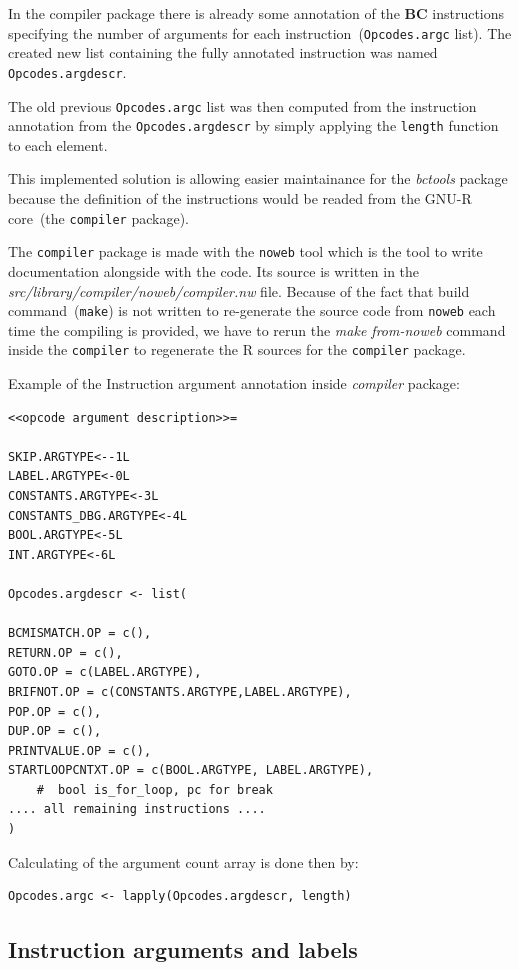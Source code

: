 \documentclass[thesis=M,english]{FITthesis}[2018/10/20]
\newcommand{\code}[1]{\texttt{#1}}
\begin{document}
In the compiler package there is already some annotation of the \textbf{BC} instructions specifying the number of arguments for each instruction~(\code{Opcodes.argc} list). The created new list containing the fully annotated instruction was named \code{Opcodes.argdescr}.

The old previous \code{Opcodes.argc} list was then computed from the instruction annotation from the \code{Opcodes.argdescr} by simply applying the \code{length} function to each element. 

This implemented solution is allowing easier maintainance for the \textit{bctools} package because the definition of the instructions would be readed from the GNU-R core~(the \code{compiler} package).

The \code{compiler} package is made with the \code{noweb} tool which is the tool to write documentation alongside with the code. Its source is written in the \textit{src/library/compiler/noweb/compiler.nw} file. Because of the fact that build command~(\code{make}) is not written to re-generate the source code from \code{noweb} each time the compiling is provided, we have to rerun the \textit{make from-noweb} command inside the \code{compiler} to regenerate the R sources for the \code{compiler} package.

Example of the Instruction argument annotation inside \textit{compiler} package:
\begin{lstlisting}
<<opcode argument description>>=

SKIP.ARGTYPE<--1L
LABEL.ARGTYPE<-0L
CONSTANTS.ARGTYPE<-3L
CONSTANTS_DBG.ARGTYPE<-4L
BOOL.ARGTYPE<-5L
INT.ARGTYPE<-6L

Opcodes.argdescr <- list(

BCMISMATCH.OP = c(),
RETURN.OP = c(),
GOTO.OP = c(LABEL.ARGTYPE),
BRIFNOT.OP = c(CONSTANTS.ARGTYPE,LABEL.ARGTYPE),
POP.OP = c(),
DUP.OP = c(),
PRINTVALUE.OP = c(),
STARTLOOPCNTXT.OP = c(BOOL.ARGTYPE, LABEL.ARGTYPE),
    #  bool is_for_loop, pc for break
.... all remaining instructions ....
)
\end{lstlisting}

Calculating of the argument count array is done then by:

\begin{lstlisting}
Opcodes.argc <- lapply(Opcodes.argdescr, length)
\end{lstlisting}

\subsection{Instruction arguments and labels}\label{instruction-arguments-labels}
\end{document}
